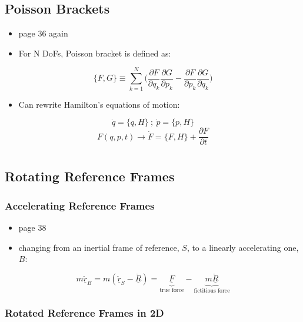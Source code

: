 \documentclass[a4paper,11pt,normalem]{article}
\begin{document}
\subsection{Poisson Brackets}\label{poisson-brackets}

\begin{itemize}
\item
  page 36 again
\item
  For N DoFs, Poisson bracket is defined as:
\end{itemize}

\[
    \{ F, G \} \equiv \sum_{k = 1}^{N} \Bigg(\frac{\partial F}{\partial q_k}\frac{\partial G}{\partial p_k} - \frac{\partial F}{\partial p_k}\frac{\partial G}{\partial q_k}\Bigg)
\]

\begin{itemize}
\item
  Can rewrite Hamilton's equations of motion:
\end{itemize}

\[
    \dot{q} = \{q, H\} ~;~ \dot{p} = \{p, H\} \] \[
    F(q, p, t) \to \dot{F} = \{F, H\} + \frac{\partial F}{\partial t}
\]

\section{}\label{lecture-13}

\subsection{Rotating Reference Frames}\label{rotating-reference-frames}

\subsubsection{Accelerating Reference Frames}\label{accelerating-reference-frames}

\begin{itemize}
\item
  page 38
\item
  changing from an inertial frame of reference, \(S\), to a linearly
  accelerating one, \(B\):
\end{itemize}

\[
    m\underline{\ddot{r}}_B = m(\underline{\ddot{r}}_S - \underline{\ddot{R}}) = \underbrace{\underline{F}}_{\text{true force}} - \underbrace{m\underline{\ddot{R}}}_{\text{fictitious force}}
\]

\subsubsection{Rotated Reference Frames in 2D}\label{rotated-reference-frames-in-2d}
\end{document}
